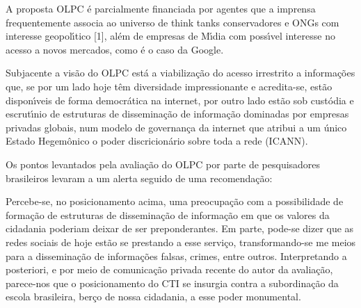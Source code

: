 \documentclass[
12pt,		%
openright,	%
twoside,  %
a4paper,			%
chapter=TITLE,		%
english,			%
french,				%
spanish,			%
brazil				%
]{USPSC-classe/USPSC}
\begin{document}
\begin{alineas}
\item \textquotedbl A proposta OLPC \'e parcialmente financiada por agentes que a imprensa frequentemente associa ao universo de think tanks conservadores e ONGs com interesse geopol\'{\i}tico [1], al\'em de empresas de M\'{\i}dia com poss\'{\i}vel interesse no acesso a novos mercados, como \'e o caso da Google.\textquotedbl 
\item \textquotedbl Subjacente a vis\~ao do OLPC est\'a a viabiliza\c{c}\~ao do acesso irrestrito a informa\c{c}\~oes que, se por um lado hoje t\^em diversidade impressionante e acredita-se, est\~ao dispon\'{\i}veis de forma democr\'atica na internet, por outro lado est\~ao sob cust\'odia e escrut\'{\i}nio de estruturas de dissemina\c{c}\~ao de informa\c{c}\~ao dominadas por empresas privadas globais, num modelo de governan\c{c}a da internet que atribui a um \'unico Estado Hegem\^onico o poder discricion\'ario sobre toda a rede (ICANN).\textquotedbl 
\end{alineas}

Os pontos levantados pela avalia\c{c}\~ao do OLPC por parte de pesquisadores brasileiros levaram a um alerta seguido de uma recomenda\c{c}\~ao:





\noindent\begin{center}\mbox{\centering{}}\end{center}


Percebe-se, no posicionamento acima, uma preocupa\c{c}\~ao com a possibilidade de forma\c{c}\~ao de estruturas de dissemina\c{c}\~ao de informa\c{c}\~ao em que os valores da cidadania poderiam deixar de ser preponderantes. Em parte, pode-se dizer que as redes sociais de hoje est\~ao se prestando a esse servi\c{c}o, transformando-se me meios para a dissemina\c{c}\~ao de informa\c{c}\~oes falsas, crimes, entre outros. Interpretando a posteriori, e por meio de comunica\c{c}\~ao privada recente do autor da avalia\c{c}\~ao, parece-nos que o posicionamento do CTI se insurgia contra a subordina\c{c}\~ao da escola brasileira, ber\c{c}o de nossa cidadania, a esse poder monumental.
\end{document}
